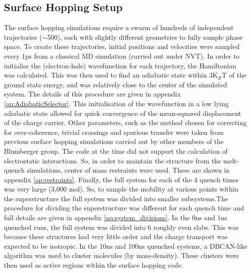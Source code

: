 \subsection{Surface Hopping Setup}
The surface hopping simulations require a swarm of hundreds of independent trajectories ($\sim$500), each with slightly different geometries to fully sample phase space. To create these trajectories, initial positions and velocities were sampled every 1ps from a classical MD simulation (carried out under NVT). In order to initialise the (electron-hole) wavefunction for each trajectory, the Hamiltonian was calculated. This was then used to find an adiabatic state within 3K$_{B}$T of the ground state energy, and was relatively close to the center of the simulated system. The details of this procedure are given in appendix \ref{ap:AdiabaticSelector}. This initialisation of the wavefunction in a low lying adiabatic state allowed for quick convergence of the mean-squared displacement of the charge carrier. Other parameters, such as the method chosen for correcting for over-coherence, trivial crossings and spurious transfer were taken from previous surface hopping simulations carried out by other members of the Blumberger group. The code at the time did not support the calculation of electrostatic interactions. So, in order to maintain the structure from the melt-quench simulations, center of mass restraints were used. These are shown in appendix \ref{ap:restraints}. Finally, the full system for each of the 4 quench times was very large (3,000 mol). So, to sample the mobility at various points within the superstructure the full system was divided into smaller subsystems.The procedure for dividing the superstructure was different for each quench time and full details are given in appendix \ref{ap:system_divisions}. In the 0ns and 1ns quenched runs, the full system was divided into 6 roughly even slabs. This was because these structures had very little order and the charge transport was expected to be isotropic. In the 10ns and 100ns quenched systems, a DBCAN-like algorithm \cite{DBSCAN} was used to cluster molecules (by mass-density). These clusters were then used as active regions within the surface hopping code.

